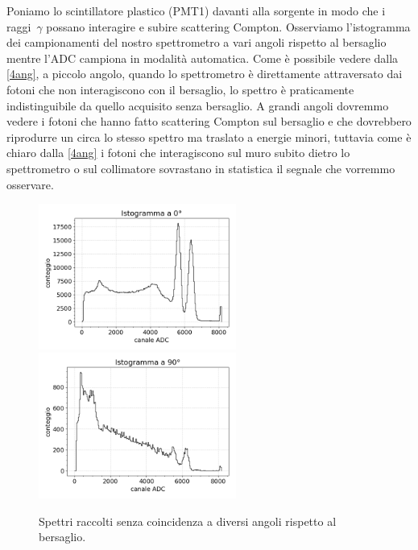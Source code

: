 Poniamo lo scintillatore plastico (PMT1) davanti alla sorgente in modo che i raggi~$\gamma$ possano interagire e subire scattering Compton. Osserviamo l'istogramma dei campionamenti del nostro spettrometro a vari angoli rispetto al bersaglio mentre l'ADC campiona in modalità automatica. 
Come è possibile vedere dalla \autoref{4ang}, a piccolo angolo, quando lo spettrometro è direttamente attraversato dai fotoni che non interagiscono con il bersaglio, lo spettro è praticamente indistinguibile da quello acquisito senza bersaglio. A grandi angoli dovremmo vedere i fotoni che hanno fatto scattering Compton sul bersaglio e che dovrebbero riprodurre un circa lo stesso spettro ma traslato a energie minori, tuttavia come è chiaro dalla  \autoref{4ang} i fotoni che interagiscono sul muro subito dietro lo spettrometro o sul collimatore sovrastano in statistica il segnale che vorremmo osservare.

\begin{figure}[h]
	\centering
	\newcommand*\mywidth{17.5em}

	\subfloat
	{\includegraphics[width=\mywidth]{0g}}
	\hfill
	\subfloat
	{\includegraphics[width=\mywidth]{90g}}

	\caption{Spettri raccolti senza coincidenza a diversi angoli rispetto al bersaglio.}
	\label{4ang}
\end{figure}

